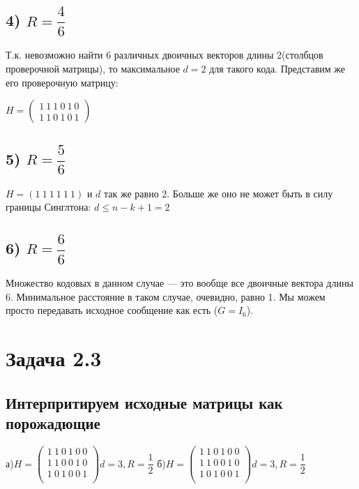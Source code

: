 \documentclass[fontsize=12pt]{article}
\begin{document}
\subsection*{4) $R = \dfrac{4}{6}$}

Т.к. невозможно найти 6 различных двоичных векторов длины 2(столбцов проверочной матрицы), то максимальное $d = 2$ для такого кода. Представим же его проверочную матрицу:

$H = \begin{pmatrix}
	 	1\ 1\ 1\ 0\ 1\ 0\\
		1\ 1\ 0\ 1\ 0\ 1
	\end{pmatrix}$
	
\subsection*{5) $R = \dfrac{5}{6}$}
	
$H = (1\ 1\ 1\ 1\ 1\ 1)$ и $d$ так же равно 2. Больше же оно не может быть в силу границы Синглтона: $d \leq n - k + 1 = 2$

\subsection*{6) $R = \dfrac{6}{6}$}

Множество кодовых в данном случае --- это вообще все двоичные вектора длины 6. Минимальное расстояние в таком случае, очевидно, равно 1. Мы можем просто передавать исходное сообщение как есть ($G = I_6$).	

\section*{Задача 2.3}

\subsection*{Интерпритируем исходные матрицы как порожадющие}

а)$H = \begin{pmatrix}
1\ 1\ 0\ 1\ 0\ 0\\
1\ 1\ 0\ 0\ 1\ 0\\
1\ 0\ 1\ 0\ 0\ 1\\
\end{pmatrix} d = 3, R = \dfrac{1}{2}$
{ } { } { }  { } { } { }
б)$H = \begin{pmatrix}
1\ 1\ 0\ 1\ 0\ 0\\
1\ 1\ 0\ 0\ 1\ 0\\
1\ 0\ 1\ 0\ 0\ 1\\
\end{pmatrix} d = 3, R = \dfrac{1}{2}$\\\\
\end{document}
